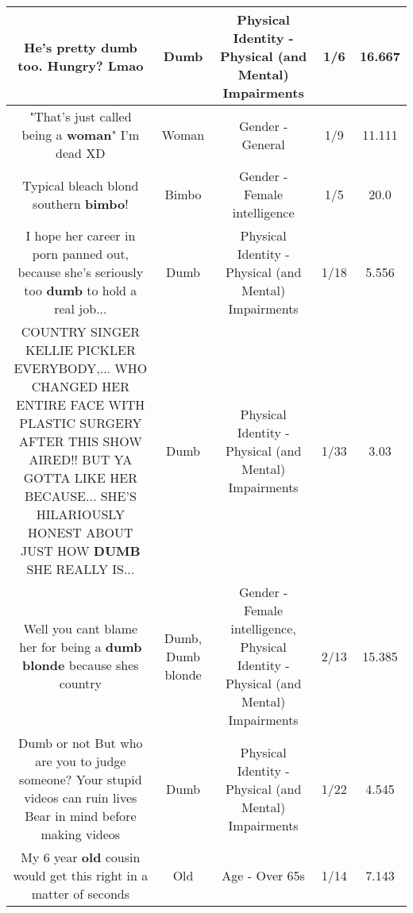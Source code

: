 \documentclass[11pt]{article}
\newlength\mylength
\begin{document}
\begin{center}
\begin{longtable}{|C{.65\mylength}|C{.30\mylength}|C{.12\mylength}|C{.12\mylength}|C{.12\mylength}|}
  \small He's pretty \textbf{dumb} too. Hungry? Lmao\normalsize   & Dumb & Physical Identity - Physical (and Mental) Impairments & 1/6 & 16.667 \\  \hline
  \small "That's just called being a \textbf{woman}" I'm dead XD\normalsize   & Woman & Gender - General & 1/9 & 11.111 \\  \hline
  \small Typical bleach blond southern \textbf{bimbo}!\normalsize   & Bimbo & Gender - Female intelligence & 1/5 & 20.0 \\  \hline
  \small I hope her career in porn panned out, because she's seriously too \textbf{dumb} to hold a real job...\normalsize   & Dumb & Physical Identity - Physical (and Mental) Impairments & 1/18 & 5.556 \\  \hline
  \small COUNTRY SINGER KELLIE PICKLER EVERYBODY,... WHO CHANGED HER ENTIRE FACE WITH PLASTIC SURGERY AFTER THIS SHOW AIRED!! BUT YA GOTTA LIKE HER BECAUSE... SHE'S HILARIOUSLY HONEST ABOUT JUST HOW \textbf{DUMB} SHE REALLY IS...\normalsize   & Dumb & Physical Identity - Physical (and Mental) Impairments & 1/33 & 3.03 \\  \hline
  \small Well you cant blame her for being a \textbf{d\textbf{umb} blonde} because shes country\normalsize   & Dumb, Dumb blonde & Gender - Female intelligence, Physical Identity - Physical (and Mental) Impairments & 2/13 & 15.385 \\  \hline
  \small Dumb or not But who are you to judge someone? Your stupid videos can ruin lives Bear in mind before making videos\normalsize   & Dumb & Physical Identity - Physical (and Mental) Impairments & 1/22 & 4.545 \\  \hline
  \small My 6 year \textbf{old} cousin would get this right in a matter of seconds\normalsize   & Old & Age - Over 65s & 1/14 & 7.143 \\  \hline

\end{longtable}
\end{center}
\end{document}
